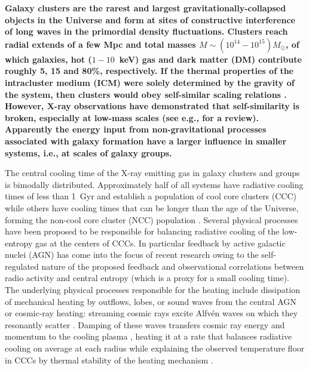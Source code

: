 \documentclass[useAMS,usenatbib]{mn2e}
\begin{document}
{\bf Galaxy clusters are the rarest and largest gravitationally-collapsed
  objects in the Universe and form at sites of constructive interference of long
  waves in the primordial density fluctuations. Clusters reach radial extends of
  a few Mpc and total masses $M \sim (10^{14} - 10^{15}) M_{\odot}$, of which
  galaxies, hot ($1-10$~keV) gas and dark matter (DM) contribute roughly 5, 15
  and 80\%, respectively. If the thermal properties of the intracluster medium
  (ICM) were solely determined by the gravity of the system, then clusters would
  obey self-similar scaling relations \citep{1986MNRAS.222..323K}.  However,
  X-ray observations have demonstrated that self-similarity is broken,
  especially at low-mass scales (see e.g., \citealp{2005RvMP...77..207V} for a
  review). Apparently the energy input from non-gravitational processes
  associated with galaxy formation have a larger influence in smaller systems,
  i.e., at scales of galaxy groups.

  The central cooling time of the X-ray emitting gas in galaxy clusters and
  groups is bimodally distributed. Approximately half of all systems have
  radiative cooling times of less than 1~Gyr and establish a population of cool
  core clusters (CCC) while others have cooling times that can be longer than
  the age of the Universe, forming the non-cool core cluster (NCC) population
  \citep{2009ApJS..182...12C,2010A&A...513A..37H}. Several physical processes
  have been proposed to be responsible for balancing radiative cooling of the
  low-entropy gas at the centers of CCCs. In particular feedback by active
  galactic nuclei (AGN) has come into the focus of recent research
  \citep{2007ARA&A..45..117M, 2012NJPh...14e5023M} owing to the self-regulated
  nature of the proposed feedback and observational correlations between radio
  activity and central entropy (which is a proxy for a small cooling time). The
  underlying physical processes responsible for the heating include dissipation
  of mechanical heating by outflows, lobes, or sound waves from the central AGN
  \citep[e.g.,][]{2001ApJ...554..261C, 2002Natur.418..301B, 2002ApJ...581..223R,
    2012MNRAS.424..190G} or cosmic-ray heating: streaming cosmic rays excite
  Alfv\'en waves on which they resonantly scatter \citep{1969ApJ...156..445K}.
  Damping of these waves transfers cosmic ray energy and momentum to the cooling
  plasma \citep{1991ApJ...377..392L, 2008MNRAS.384..251G, 2011A&A...527A..99E,
    2013MNRAS.434.2209W}, heating it at a rate that balances radiative cooling
  on average at each radius while explaining the observed temperature floor in
  CCCs by thermal stability of the heating mechanism
  \citep{2013arXiv1303.5443P}.

}
\end{document}
